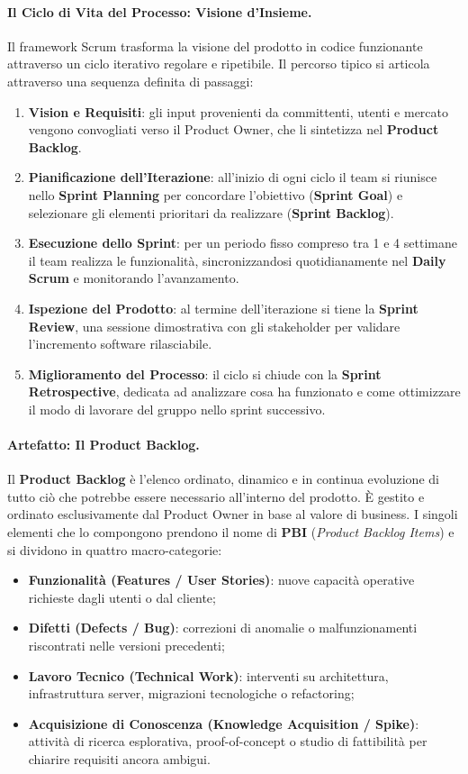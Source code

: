 \documentclass[12pt]{extarticle}
\begin{document}
\paragraph{Il Ciclo di Vita del Processo: Visione d'Insieme.}
Il framework Scrum trasforma la visione del prodotto in codice funzionante attraverso un ciclo iterativo regolare e ripetibile. Il percorso tipico si articola attraverso una sequenza definita di passaggi:
\begin{enumerate}
    \item \textbf{Vision e Requisiti}: gli input provenienti da committenti, utenti e mercato vengono convogliati verso il Product Owner, che li sintetizza nel \textbf{Product Backlog}.
    \item \textbf{Pianificazione dell'Iterazione}: all'inizio di ogni ciclo il team si riunisce nello \textbf{Sprint Planning} per concordare l'obiettivo (\textbf{Sprint Goal}) e selezionare gli elementi prioritari da realizzare (\textbf{Sprint Backlog}).
    \item \textbf{Esecuzione dello Sprint}: per un periodo fisso compreso tra 1 e 4 settimane il team realizza le funzionalità, sincronizzandosi quotidianamente nel \textbf{Daily Scrum} e monitorando l'avanzamento.
    \item \textbf{Ispezione del Prodotto}: al termine dell'iterazione si tiene la \textbf{Sprint Review}, una sessione dimostrativa con gli stakeholder per validare l'incremento software rilasciabile.
    \item \textbf{Miglioramento del Processo}: il ciclo si chiude con la \textbf{Sprint Retrospective}, dedicata ad analizzare cosa ha funzionato e come ottimizzare il modo di lavorare del gruppo nello sprint successivo.
\end{enumerate}

\paragraph{Artefatto: Il Product Backlog.}
Il \textbf{Product Backlog} è l'elenco ordinato, dinamico e in continua evoluzione di tutto ciò che potrebbe essere necessario all'interno del prodotto. È gestito e ordinato esclusivamente dal Product Owner in base al valore di business. I singoli elementi che lo compongono prendono il nome di \textbf{PBI} (\textit{Product Backlog Items}) e si dividono in quattro macro-categorie:
\begin{itemize}
    \item \textbf{Funzionalità (Features / User Stories)}: nuove capacità operative richieste dagli utenti o dal cliente;
    \item \textbf{Difetti (Defects / Bug)}: correzioni di anomalie o malfunzionamenti riscontrati nelle versioni precedenti;
    \item \textbf{Lavoro Tecnico (Technical Work)}: interventi su architettura, infrastruttura server, migrazioni tecnologiche o refactoring;
    \item \textbf{Acquisizione di Conoscenza (Knowledge Acquisition / Spike)}: attività di ricerca esplorativa, proof-of-concept o studio di fattibilità per chiarire requisiti ancora ambigui.
\end{itemize}
\end{document}
